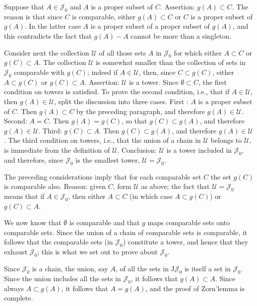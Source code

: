 Suppose that $A \in \mathcal{J}_{0}$ and $A$ is a proper subset of $C$. Assertion: $g(A) \subset C$. The reason is that since $C$ is comparable, either $g(A) \subset C$ or $C$ is a proper subset of $g(A)$. In the latter case $A$ is a proper subset of a proper subset of $g(A)$, and this contradicts the fact that $g(A) - A$ cannot be more than a singleton. 

Consider next the collection $\mathcal{U}$ of all those sets $A$ in $\mathcal{J}_{0}$ for which either $A \subset C$ or $g(C) \subset A$. The collection $\mathcal{U}$ is somewhat smaller than the collection of sets in $\mathcal{J}_{0}$ comparable with $g(C)$; indeed if $A \in \mathcal{U}$, then, since $C \subset g(C)$, either $A \subset g(C)$ or $g(C) \subset A$. Assertion: $\mathcal{U}$ is a tower. Since $\emptyset \subset C$, the first condition on towers is satisfied. To prove the second condition, i.e., that if $A \in \mathcal{U}$, then $g(A) \in \mathcal {U}$, split the discussion into three cases. First : $A$ is a proper subset of $C$. Then $g(A) \subset C$ by the preceding paragraph, and therefore $g(A) \in \mathcal{U}$. Second: $A = C$. Then $g(A) = g(C)$, so that $g(C) \subset g(A)$, and therefore $g(A) \in \mathcal{U}$. Third: $g(C) \subset A$. Then $g(C) \subset g(A)$, and therefore $g(A) \in \mathcal{U}$. The third condition on towers, i.e., that the union of a chain in $\mathcal{U}$ belongs to $\mathcal{U}$, is immediate from the definition of $\mathcal{U}$. Conclusion: $\mathcal{U}$ is a tower included in $\mathcal{J}_{0}$, and therefore, since $\mathcal{J}_{0}$ is the smallest tower, $\mathcal{U} = \mathcal{J}_{0}$. 

The preceding considerations imply that for each comparable set $C$ the set $g(C)$ is comparable also. Reason: given $C$, form $\mathcal{U}$ as above; the fact that $\mathcal{U} = \mathcal{J}_{0}$ means that if $A \in \mathcal{J}_{0}$, then either $A \subset C$ (in which case $A \subset g(C)$) or $g(C) \subset A$.

We now know that $\emptyset$ is comparable and that $g$ maps comparable sets onto comparable sets. Since the union of a chain of comparable sets is comparable, it follows that the comparable sets (in $\mathcal{J}_{0}$) constitute a tower, and hence that they exhaust $\mathcal{J}_{0}$; this is what we set out to prove about $\mathcal{J}_{0}$. 

Since $\mathcal{J}_{0}$ is a chain, the union, say $A$, of all the sets in J$\mathcal{J}_{0}$ is itself a set in $\mathcal{J}_{0}$. Since the union includes all the sets in $\mathcal{J}_{0}$, it follows that $g(A) \subset A$. Since always $A \subset g(A)$, it follows that $A = g(A)$, and the proof of Zorn'lemma is complete.

